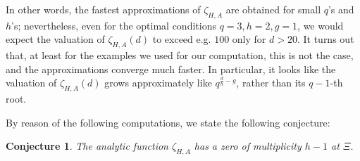 \documentclass[11pt]{amsart}
\numberwithin{equation}{section}
\newtheorem{Conjecture}[Theorem]{Conjecture}
\begin{document}
In other words, the fastest approximations of $\zeta_{H,A}$ are obtained for small $q$'s and $h$'s; nevertheless, even for the optimal conditions $q=3,h=2,g=1$, we would expect the valuation of $\zeta_{H,A}(d)$ to exceed e.g. $100$ only for $d>20$. It turns out that, at least for the examples we used for our computation, this is not the case, and the approximations converge much faster. In particular, it looks like the valuation of $\zeta_{H,A}(d)$ grows approximately like $q^{\frac{d}{h}-g}$, rather than its $q-1$-th root.

By reason of the following computations, we state the following conjecture:
\begin{Conjecture}\label{multiplicity-conjecture} The analytic function $\zeta_{H,A}$ has a zero of multiplicity $h-1$ at $\Xi$.
\end{Conjecture}
\end{document}
